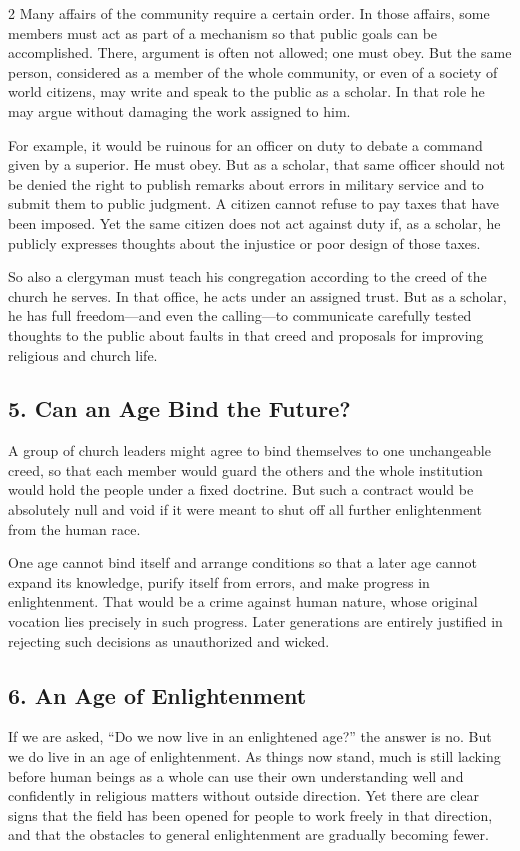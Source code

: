 \documentclass[12pt]{article}
\begin{document}
\begin{multicols}{2}
Many affairs of the community require a certain order. In those affairs, some members must act as part of a mechanism so that public goals can be accomplished. There, argument is often not allowed; one must obey. But the same person, considered as a member of the whole community, or even of a society of world citizens, may write and speak to the public as a scholar. In that role he may argue without damaging the work assigned to him.

For example, it would be ruinous for an officer on duty to debate a command given by a superior. He must obey. But as a scholar, that same officer should not be denied the right to publish remarks about errors in military service and to submit them to public judgment. A citizen cannot refuse to pay taxes that have been imposed. Yet the same citizen does not act against duty if, as a scholar, he publicly expresses thoughts about the injustice or poor design of those taxes.

So also a clergyman must teach his congregation according to the creed of the church he serves. In that office, he acts under an assigned trust. But as a scholar, he has full freedom---and even the calling---to communicate carefully tested thoughts to the public about faults in that creed and proposals for improving religious and church life.

\subsection*{5. Can an Age Bind the Future?}
A group of church leaders might agree to bind themselves to one unchangeable creed, so that each member would guard the others and the whole institution would hold the people under a fixed doctrine. But such a contract would be absolutely null and void if it were meant to shut off all further enlightenment from the human race.

One age cannot bind itself and arrange conditions so that a later age cannot expand its knowledge, purify itself from errors, and make progress in enlightenment. That would be a crime against human nature, whose original vocation lies precisely in such progress. Later generations are entirely justified in rejecting such decisions as unauthorized and wicked.

\subsection*{6. An Age of Enlightenment}
If we are asked, ``Do we now live in an enlightened age?'' the answer is no. But we do live in an age of enlightenment. As things now stand, much is still lacking before human beings as a whole can use their own understanding well and confidently in religious matters without outside direction. Yet there are clear signs that the field has been opened for people to work freely in that direction, and that the obstacles to general enlightenment are gradually becoming fewer.


\end{multicols}
\end{document}
